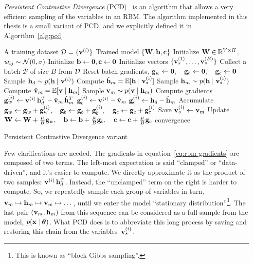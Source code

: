 \emph{Persistent Contrastive Divergence}
(PCD)~\cite{bib:rbm-persistent-cd} is an algorithm that allows a very efficient sampling of the
variables in an RBM.  The algorithm implemented in this thesis is a small
variant of PCD, and we explicitly defined it in Algorithm~\ref{alg:pcd}.
\begin{algorithm}[thb]
	\centering
	\begin{algorithmic}[1]
		\Require A training dataset $\mathcal{D} = \{\mathbf{v}^{(i)}\}$
		\Ensure Trained model $\{\mathbf{W}, \mathbf{b}, \mathbf{c}\}$
		\State Initialize $\mathbf{W} \in \mathbb{R}^{V \times H}$,
			$w_{ij} \sim \mathcal{N}(0,\sigma)$
		\State Initialize $\mathbf{b} \gets \mathbf{0}, \mathbf{c} \gets \mathbf{0}$
		\State Initialize vectors $\{\mathbf{v}_s^{(1)}, \dots, \mathbf{v}_s^{(B)}\}$
		\Repeat
			\State Collect a batch $\mathcal{B}$ of size $B$ from $\mathcal{D}$
			\State Reset batch gradients, $\mathbf{g}_w \gets \mathbf{0},
				\quad \mathbf{g}_b \gets \mathbf{0},
				\quad \mathbf{g}_c \gets \mathbf{0}$
				\State Sample $\mathbf{h}_d \sim p(\mathbf{h} \mid \mathbf{v}^{(i)})$
				\State Compute $\hat{\mathbf{h}}_m = \mathbb{E}[\mathbf{h} \mid \mathbf{v}_s^{(i)}]$
				\State Sample $\mathbf{h}_m \sim p(\mathbf{h} \mid \mathbf{v}_s^{(i)})$
				\State Compute $\hat{\mathbf{v}}_m = \mathbb{E}[\mathbf{v} \mid \mathbf{h}_m]$
				\State Sample $\mathbf{v}_m \sim p(\mathbf{v} \mid \mathbf{h}_m)$
				\State Compute gradients 
					\Statex[3] $\mathbf{g}_w^{(i)} \gets
						\mathbf{v}^{(i)}\, \mathbf{h}_d^T - \hat{\mathbf{v}}_m\, \hat{\mathbf{h}}_m^T$
					\Statex[3] $\mathbf{g}_b^{(i)} \gets \mathbf{v}^{(i)} - \hat{\mathbf{v}}_m$
					\Statex[3] $\mathbf{g}_c^{(i)} \gets \mathbf{h}_d - \hat{\mathbf{h}}_m$
				\State Accumulate $\mathbf{g}_w \gets \mathbf{g}_w + \mathbf{g}_w^{(i)},
					\quad \mathbf{g}_b \gets \mathbf{g}_b + \mathbf{g}_b^{(i)},
					\quad \mathbf{g}_c \gets \mathbf{g}_c + \mathbf{g}_c^{(i)}$
				\State Save $\mathbf{v}_s^{(i)} \gets \mathbf{v}_m$
			\EndFor
			\State Update $\mathbf{W} \gets \mathbf{W} + \frac{\mu}{B} \mathbf{g}_w,
				\quad \mathbf{b} \gets \mathbf{b} + \frac{\mu}{B} \mathbf{g}_b,
				\quad \mathbf{c} \gets \mathbf{c} + \frac{\mu}{B} \mathbf{g}_c$
		\Until convergence
	\end{algorithmic}
	\caption{Persistent Contrastive Divergence variant}
	\label{alg:pcd}
\end{algorithm}

Few clarifications are needed. The gradients in
equation~\ref{eq:rbm-gradients} are composed of two terms. The left-most
expectation is said ``clamped'' or ``data-driven'', and it's easier to
compute. We directly approximate it as the product of two samples:
$\mathbf{v}^{(i)}\, \mathbf{h}_d^T$. Instead, the ``unclamped'' term on the right is
harder to compute. So, we repeatedly sample each group of variables in turn,
$\mathbf{v}_m \mapsto \mathbf{h}_m \mapsto \mathbf{v}_m \mapsto \dots$, until we enter the model
``stationary distribution''\footnote{This is known as ``block Gibbs
sampling''.}. The last pair $(\mathbf{v}_m, \mathbf{h}_m)$ from this sequence can be
considered as a full sample from the model, $p(\mathbf{x} \mid \bm{\theta})$. What PCD
does is to abbreviate this long process by saving and restoring this chain
from the variables~$\mathbf{v}_s^{(i)}$.

